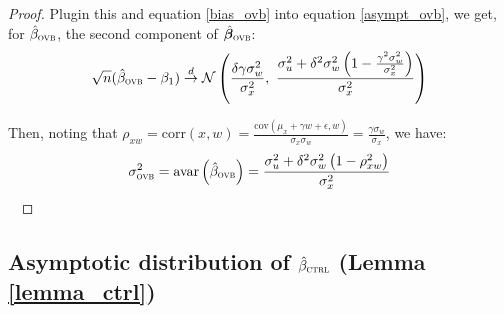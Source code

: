 \documentclass[usletter, 12pt]{article}
\begin{document}
\begin{proof}
				Plugin this and equation \ref{bias_ovb} into equation \ref{asympt_ovb}, we get, for $\hat{\beta}_{\textsc{ovb}}$, the second component of $\hat{\bm{\beta}}_{\textsc{ovb}}$:
				~
				\begin{equation*}
					\sqrt{n}(\hat{\beta}_{\textsc{ovb}} - \beta_1) \overset{d}{\to} \mathcal{N}\left( \dfrac{\delta \gamma \sigma_{w}^{2}}{\sigma_{x}^{2}}, \ \dfrac{ \sigma_{u}^{2} +  \delta^{2} \sigma_{w}^{2} \left(1 - \frac{\gamma^{2}\sigma_{w}^{2}}{\sigma_{x}^{2}} \right)}{\sigma_{x}^{2}} \right) 
				\end{equation*}
				
				Then, noting that $\rho_{xw} =  \text{corr}(x, w) = \frac{ \text{cov}(\mu_{x} + \gamma w + \epsilon, w)}{\sigma_{x}\sigma_{w}} = \frac{\gamma\sigma_{w}}{\sigma_{x}}$, we have:
				\[
					\sigma_{\textsc{ovb}}^{2} = \text{avar}\left(\hat{\beta}_{\textsc{ovb}}\right) = \dfrac{ \sigma_{u}^{2} +  \delta^{2} \sigma_{w}^{2} \left(1 - \rho_{xw}^{2} \right)}{\sigma_{x}^{2}}
				\]
				~
			\end{proof}

	

\subsection{Asymptotic distribution of $\hat{\beta}_{\textsc{ctrl}}$ (Lemma \ref{lemma_ctrl})}
	
\end{document}
